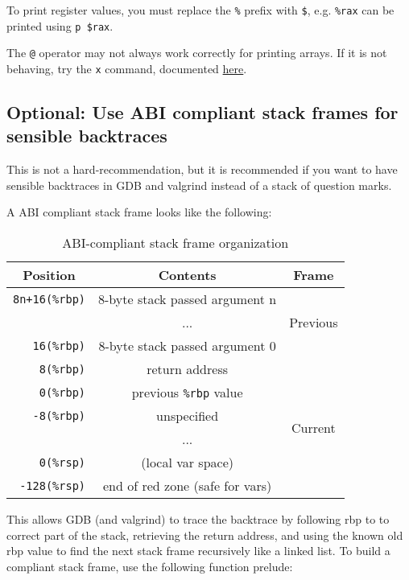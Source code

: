 \documentclass[11pt]{article}
\begin{document}
To print register values, you must replace the \texttt{\%} prefix with \texttt{\$}, e.g.
\texttt{\%rax} can be printed using \texttt{p \$rax}.

The \texttt{@} operator may not always work correctly for printing arrays. If it is not
behaving, try the \texttt{x} command, documented
\href{https://visualGDB.com/gdbreference/commands/x}{here}.

\subsection{Optional: Use ABI compliant stack frames for sensible backtraces}

This is not a hard-recommendation, but it is recommended if you want to have sensible
backtraces in GDB  and valgrind instead of a stack of question marks.

A ABI compliant stack frame looks like the following:

\begin{table}[h]
\begin{tabular}{r | c | c}
    \multicolumn{1}{c}{Position} & \multicolumn{1}{c}{Contents} & \multicolumn{1}{c}{Frame}\\\hline
    \texttt{8n+16(\%rbp)} & 8-byte stack passed argument n  & \multirow{3}{*}{Previous} \\
                          & ...                             & \\
       \texttt{16(\%rbp)} & 8-byte stack passed argument 0  & \\\hline
        \texttt{8(\%rbp)} & return address                  & \multirow{6}{*}{Current} \\\cline{2-2}
        \texttt{0(\%rbp)} & previous \texttt{\%rbp} value   & \\\cline{2-2}
       \texttt{-8(\%rbp)} & unspecified                     & \\
                          & ...                             & \\
        \texttt{0(\%rsp)} & (local var space)               & \\\cline{2-2}
     \texttt{-128(\%rsp)} & end of red zone (safe for vars) &

\end{tabular}
\caption{ABI-compliant stack frame organization}
\label{table:abi_frame}
\end{table}

This allows GDB (and valgrind) to trace the backtrace by following rbp to to correct part
of the stack, retrieving the return address, and using the known old rbp value to find the
next stack frame recursively like a linked list. To build a compliant stack frame, use the
following function prelude:
\end{document}
